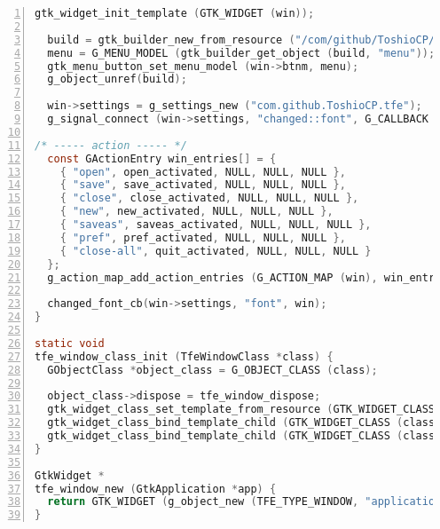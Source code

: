 \begin{lstlisting}[language=C, numbers=left]
  gtk_widget_init_template (GTK_WIDGET (win));

  build = gtk_builder_new_from_resource ("/com/github/ToshioCP/tfe/menu.ui");
  menu = G_MENU_MODEL (gtk_builder_get_object (build, "menu"));
  gtk_menu_button_set_menu_model (win->btnm, menu);
  g_object_unref(build);

  win->settings = g_settings_new ("com.github.ToshioCP.tfe");
  g_signal_connect (win->settings, "changed::font", G_CALLBACK (changed_font_cb), win);

/* ----- action ----- */
  const GActionEntry win_entries[] = {
    { "open", open_activated, NULL, NULL, NULL },
    { "save", save_activated, NULL, NULL, NULL },
    { "close", close_activated, NULL, NULL, NULL },
    { "new", new_activated, NULL, NULL, NULL },
    { "saveas", saveas_activated, NULL, NULL, NULL },
    { "pref", pref_activated, NULL, NULL, NULL },
    { "close-all", quit_activated, NULL, NULL, NULL }
  };
  g_action_map_add_action_entries (G_ACTION_MAP (win), win_entries, G_N_ELEMENTS (win_entries), win);

  changed_font_cb(win->settings, "font", win);
}

static void
tfe_window_class_init (TfeWindowClass *class) {
  GObjectClass *object_class = G_OBJECT_CLASS (class);

  object_class->dispose = tfe_window_dispose;
  gtk_widget_class_set_template_from_resource (GTK_WIDGET_CLASS (class), "/com/github/ToshioCP/tfe/tfewindow.ui");
  gtk_widget_class_bind_template_child (GTK_WIDGET_CLASS (class), TfeWindow, btnm);
  gtk_widget_class_bind_template_child (GTK_WIDGET_CLASS (class), TfeWindow, nb);
}

GtkWidget *
tfe_window_new (GtkApplication *app) {
  return GTK_WIDGET (g_object_new (TFE_TYPE_WINDOW, "application", app, NULL));
}
\end{lstlisting}

